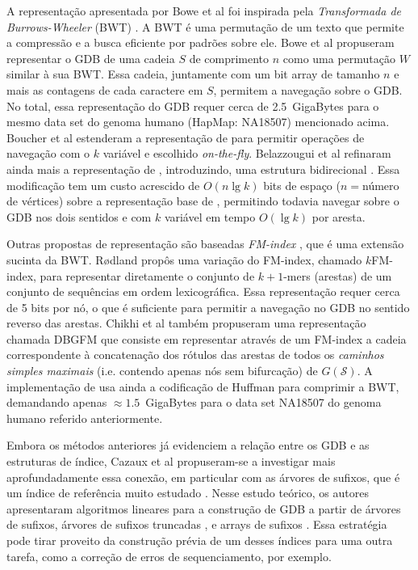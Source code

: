 \documentclass[12pt, a4paper, oneside]{article}
\newcommand{\strset}[1]{\ensuremath{\mathcal{#1}}\xspace}
\newcommand{\ssS}{\strset{S}}
\begin{document}
A representação apresentada por Bowe et al \cite{Bowe2012} foi inspirada pela \emph{Transformada de Burrows-Wheeler} (BWT) \cite{Burrows1994}. 
A BWT é uma permutação de um texto que permite a compressão e a busca eficiente por padrões sobre ele. Bowe et al propuseram representar o GDB de uma cadeia $S$ de comprimento $n$ como uma permutação $W$ similar à sua BWT. Essa cadeia, juntamente com um bit array de tamanho $n$ e mais as contagens de cada caractere em $S$, permitem a navegação sobre o GDB. No total, essa representação do GDB requer cerca de 2.5~GigaBytes para o mesmo data set do genoma humano (HapMap: NA18507) mencionado acima.
Boucher et al \cite{Boucher2015} estenderam a representação de \cite{Bowe2012} para permitir operações de navegação com o $k$ variável e escolhido \emph{on-the-fly}. Belazzougui et al \cite{Belazzougui2016} refinaram ainda mais a re\-pre\-sen\-ta\-ção de \cite{Boucher2015}, introduzindo, uma estrutura bidirecional \cite{Schnattinger2012}. Essa modificação tem um custo acrescido de $O(n\lg k)$ bits de espaço ($n=$número de vértices) sobre a representação base de \cite{Bowe2012}, permitindo todavia navegar sobre o GDB nos dois sentidos e com $k$ variável em tempo $O(\lg k)$ por aresta. 

Outras propostas de representação são baseadas \emph{FM-index} \cite{Ferragina2000}, que é uma extensão sucinta da BWT. R{\o}dland \cite{Rodland2013} propôs uma variação do FM-index, chamado $k$FM-index, para representar diretamente o conjunto de $k+1$-mers (arestas) de um conjunto de sequências em ordem lexicográfica. Essa representação requer cerca de 5 bits por nó, o que é suficiente para permitir a navegação no GDB no sentido reverso das arestas.
Chikhi et al \cite{Chikhi2015} também propuseram uma representação chamada DBGFM que consiste em representar através de um FM-index a cadeia correspondente à concatenação dos rótulos das arestas de todos os \emph{caminhos simples maximais} (i.e. contendo apenas nós sem bifurcação) de $G(\ssS)$. A implementação de \cite{Chikhi2015} usa ainda a codificação de Huffman para comprimir a BWT, demandando apenas $\approx 1.5$~GigaBytes para o data set NA18507 do genoma humano referido anteriormente. 

Embora os métodos anteriores já evidenciem a relação entre os GDB e as estruturas de índice, Cazaux et al \cite{Cazaux2016} propuseram-se a investigar mais aprofundadamente essa conexão, em particular com as árvores de sufixos, que é um índice de referência muito estudado \cite{Apostolico1985}. Nesse estudo teórico, os autores apresentaram algoritmos lineares para a construção de GDB a partir de árvores de sufixos, árvores de sufixos truncadas \cite{Na2003}, e arrays de sufixos \cite{Manber1993}. Essa estratégia pode tirar proveito da construção prévia de um desses índices para uma outra tarefa, como a correção de erros de sequenciamento, por exemplo.
\end{document}
